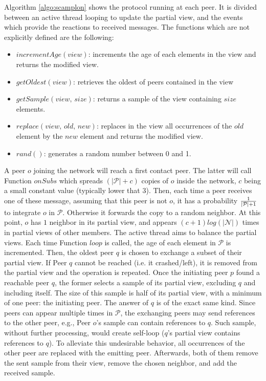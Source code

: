\begin{asparadesc}
\item [Algorithm]\ref{algo:scamplon} shows the \SCAMPLON{} protocol running at
  each peer. It is divided between an active thread looping to update the
  partial view, and the events which provide the reactions to received
  messages. The functions which are not explicitly defined are the following:
  \begin{itemize}
  \item $incrementAge(view)$: increments the age of each elements in the view
    and returns the modified view.
  \item $getOldest(view)$: retrieves the oldest of peers contained in the view
  \item $getSample(view, \, size)$: returns a sample of the view containing
    $size$ elements.
  \item $replace(view,\,old,\,new)$: replaces in the view all occurrences of
    the $old$ element by the $new$ element and returns the modified view.
  \item $rand()$: generates a random number between 0 and 1.
  \end{itemize}
  A peer $o$ joining the network will reach a first contact peer. The latter
  will call Function $onSubs$ which spreads $(|\mathcal{P}|+c)$ copies of $o$
  inside the network, $c$ being a small constant value (typically lower that
  $3$). Then, each time a peer receives one of these message, assuming that
  this peer is not $o$, it has a probability $1\over{|\mathcal{P}|+1}$ to
  integrate $o$ in $\mathcal{P}$. Otherwise it forwards the copy to a random
  neighbor.  At this point, $o$ has $1$ neighbor in its partial view, and
  appears $(c+1)log(|\mathcal{N}|)$ times in partial views of other
  members. The active thread aims to balance the partial views. Each time
  Function $loop$ is called, the age of each element in $\mathcal{P}$ is
  incremented. Then, the oldest peer $q$ is chosen to exchange a subset of
  their partial view. If Peer $q$ cannot be reached (i.e. it crashed/left), it
  is removed from the partial view and the operation is repeated. Once the
  initiating peer $p$ found a reachable peer $q$, the former selects a sample
  of its partial view, excluding $q$ and including itself. The size of this
  sample is half of its partial view, with a minimum of one peer: the
  initiating peer. The answer of $q$ is of the exact same kind. Since peers can
  appear multiple times in $\mathcal{P}$, the exchanging peers may send
  references to the other peer, e.g., Peer $o$'s sample can contain references
  to $q$. Such sample, without further processing, would create self-loop
  ($q$'s partial view contains references to $q$). To alleviate this
  undesirable behavior, all occurrences of the other peer are replaced with the
  emitting peer.  Afterwards, both of them remove the sent sample from their
  view, remove the chosen neighbor, and add the received sample.
\end{asparadesc}


